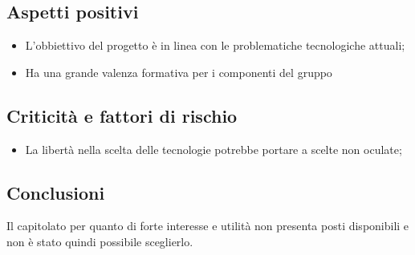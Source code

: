\subsection{Aspetti positivi}
\begin{itemize}
    \item L'obbiettivo del progetto è in linea con le problematiche tecnologiche attuali;
    \item Ha una grande valenza formativa per i componenti del gruppo
\end{itemize}
\subsection{Criticità e fattori di rischio}
\begin{itemize}
    \item La libertà nella scelta delle tecnologie potrebbe portare a scelte non oculate;
\end{itemize}
\subsection{Conclusioni}
Il capitolato per quanto di forte interesse e utilità non presenta posti disponibili e non è stato quindi possibile sceglierlo.